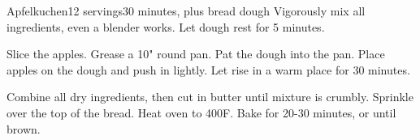 \documentclass[../Cookbook.tex]{subfiles}
\begin{document}
\begin{recipe}[Apfelkuchen]{Apfelkuchen}{12 servings}{30 minutes, plus bread dough}
	Vigorously mix all ingredients, even a blender works.
	Let dough rest for 5 minutes.

	Slice the apples.
	Grease a 10" round pan.
	Pat the dough into the pan.
	Place apples on the dough and push in lightly.
	Let rise in a warm place for 30 minutes.

	Combine all dry ingredients, then cut in butter until mixture is crumbly.
	Sprinkle over the top of the bread.
	Heat oven to 400\0F.
	Bake for 20-30 minutes, or until brown.
\end{recipe}
\end{document}

